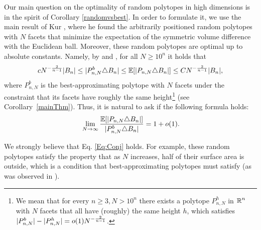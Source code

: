 
Our main question on the optimality of random polytopes in high dimensions is in the spirit of Corollary \ref{randomvsbest}. In order to formulate it,  we use the main result of Kur \cite{kur2017approximation}, where he found the arbitrarily positioned random polytopes with $N$ facets that minimize the expectation of the symmetric volume difference with the Euclidean ball. Moreover, these random polytopes are optimal up to absolute constants. Namely, by \cite[Theorem 2]{Lud06} and \cite[Remark 2.2]{kur2017approximation}, for all $N \geq 10^n$ it holds that
\[
	cN^{-\frac 2{n-1}}|B_n| \leq |P^b_{n,N} \triangle B_n| \leq {\mathbb{E}}[|P_{n,N} \triangle B_n|] \leq CN^{-\frac 2{n-1}}|B_n|,
\]
where $P^b_{n,N}$ is the best-approximating polytope with $N$ facets under the constraint that its facets have roughly the same height\footnote{We mean that for every $n \geq 3, N > 10^{n}$ there exists a polytope $P_{n,N}^h$ in $\operatorname{\mathbb{R}}^n$ with $N$ facets that all have (roughly) the same height $h$, which satisfies $|P^b_{n,N}|-|P^h_{n,N}| = o(1)N^{-\frac 2{n-1}}$.} (see Corollary~\ref{mainThm}). Thus, it is natural to ask if the following formula holds:
\begin{equation}{\label{Eq:Conj}}
	\lim_{N\to\infty}\frac{{\mathbb{E}}[|P_{n,N} \triangle B_n|]}{|P^b_{n,N} \triangle B_n|} = 1+o(1).
\end{equation}

We strongly believe that Eq. \eqref{Eq:Conj} holds. For example, these random polytopes satisfy the property that as $N$ increases, half of their surface area is outside, which is a condition that best-approximating polytopes must satisfy (as was observed in \cite[Lemma 9]{Lud06}).

